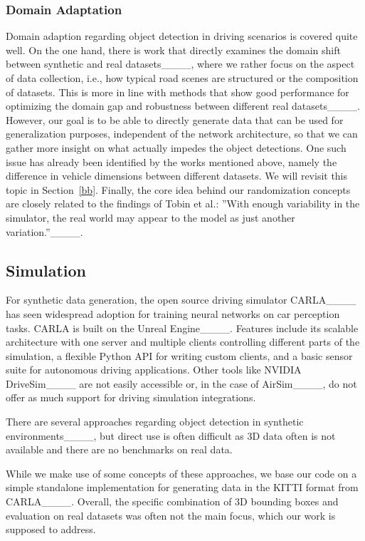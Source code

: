 \subsubsection{Domain Adaptation}
Domain adaption regarding object detection in driving scenarios is covered quite well. On the one hand, there is work that directly examines the domain shift between synthetic and real datasets____, where we rather focus on the aspect of data collection, i.e., how typical road scenes are structured or the composition of datasets.
This is more in line with methods that show good performance for optimizing the domain gap and robustness between different real datasets____.
However, our goal is to be able to directly generate data that can be used for generalization purposes, independent of the network architecture, so that we can gather more insight on what actually impedes the object detections.
One such issue has already been identified by the works mentioned above, namely the difference in vehicle dimensions between different datasets.
We will revisit this topic in Section~\ref{bb}.
Finally, the core idea behind our randomization concepts are closely related to the findings of Tobin et al.: ”With enough variability in
the simulator, the real world may appear to the model as just
another variation.”____. 

\subsection{Simulation}
For synthetic data generation, the open source driving simulator CARLA____ has seen widespread adoption for training neural networks on car perception tasks. CARLA is built on the Unreal Engine____. Features include its scalable architecture with one server and multiple clients controlling different parts of the simulation, a flexible Python API for writing custom clients, and a basic sensor suite for autonomous driving applications. Other tools like NVIDIA DriveSim____ are not easily accessible or, in the case of AirSim____, do not offer as much support for driving simulation integrations.

There are several approaches regarding object detection in synthetic environments____, but direct use is often difficult as 3D data often is not available and there are no benchmarks on real data.


While we make use of some concepts of these approaches, we base our code on a simple standalone implementation for generating data in the KITTI format from CARLA____. %
Overall, the specific combination of 3D bounding boxes and evaluation on real datasets was often not the main focus, which our work is supposed to address.

